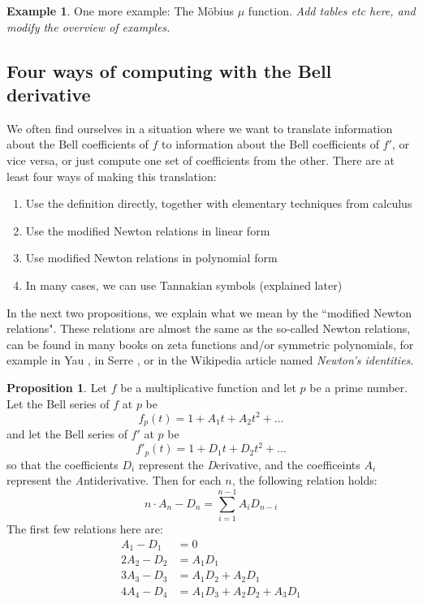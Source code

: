 \documentclass[a4paper]{article}
\theoremstyle{definition}
\newtheorem{example}{Example}[section]
\newtheorem{proposition}[theorem]{Proposition}
\theoremstyle{remark}
\begin{document}
\begin{example}
One more example: The M{\"o}bius $\mu$ function. \emph{Add tables etc here, and modify the overview of examples.}
\end{example}

\subsection{Four ways of computing with the Bell derivative}

We often find ourselves in a situation where we want to translate information about the Bell coefficients of $f$ to information about the Bell coefficients of $f'$, or vice versa, or just compute one set of coefficients from the other. There are at least four ways of making this translation:

\begin{enumerate}
\item Use the definition directly, together with elementary techniques from calculus
\item Use the modified Newton relations in linear form
\item Use modified Newton relations in polynomial form
\item In many cases, we can use Tannakian symbols (explained later)
\end{enumerate}

In the next two propositions, we explain what we mean by the ``modified Newton relations". These relations are almost the same as the so-called Newton relations, can be found in many books on zeta functions and/or symmetric polynomials, for example in Yau \cite{}, in Serre \cite{}, or in the Wikipedia article named \emph{Newton's identities}.

\begin{proposition}
Let $f$ be a multiplicative function and let $p$ be a prime number. Let the Bell series of $f$ at $p$ be
$$  f_p(t) = 1 + A_1 t + A_2 t^2 + \ldots  $$
and let the Bell series of $f'$ at $p$ be
$$ f'_p(t) = 1 + D_1 t + D_2 t^2 + \ldots    $$
so that the coefficients $D_i$ represent the \emph{D}erivative, and the coefficeints $A_i$ represent the \emph{A}ntiderivative. Then for each $n$, the following relation holds:
$$ n \cdot A_n - D_n = \sum_{i=1}^{n-1} A_i D_{n-i} $$
The first few relations here are:
\begin{align*} 
A_1 - D_1 &=  0 \\ 
2 A_2 - D_2 &=  A_1 D_1 \\
3 A_3 - D_3 &= A_1 D_2 + A_2 D_1 \\
4 A_4 - D_4 &= A_1 D_3 + A_2 D_2 + A_3 D_1
\end{align*}
\end{proposition}
\end{document}
